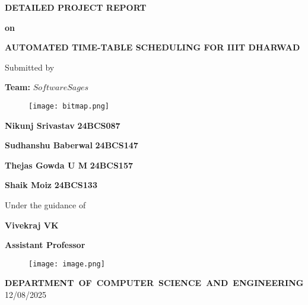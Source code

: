 \documentclass[a4paper,12pt]{article}
\begin{document}
\begin{titlepage}
\doublespacing

\begin{center}
\par {\small \textbf{DETAILED PROJECT REPORT}}\\
\end{center}

\begin{center}
	\par {\small \textbf{on}}
\end{center}


\begin{center}
{\small \textbf{AUTOMATED TIME-TABLE SCHEDULING FOR IIIT DHARWAD}}
\end{center}

{\small
\begin{center}
\par \small {Submitted by}
\par \small \textbf{Team: }\textbf{$SoftwareSages$}
\begin{figure}[H]
    \centering
    \texttt{[image: bitmap.png]}
\end{figure}
\par \small \textbf{Nikunj Srivastav} \textbf{24BCS087}
\par \small \textbf{Sudhanshu Baberwal} \textbf{24BCS147}
\par \small \textbf{Thejas Gowda U M
} \textbf{24BCS157}
\par \small \textbf{Shaik Moiz
} \textbf{24BCS133}


\par Under the guidance of
\par \small \textbf{Vivekraj VK}
\par \textbf{Assistant Professor}
\end{center}

}

\begin{figure}[h]
\begin{center}
\texttt{[image: image.png]}
\end{center}
\end{figure}
\begin{center}
\par{\mbox {\small\textbf{DEPARTMENT OF COMPUTER SCIENCE AND ENGINEERING}}}
\\
12/08/2025

\end{center}
\end{titlepage}
\end{document}
